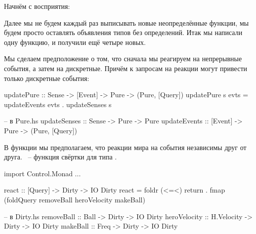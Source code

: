 Начнём с восприятия:


Далее мы не будем каждый раз выписывать новые неопределённые
функции, мы будем просто оставлять объявления типов без определений.
Итак мы написали одну функцию, и получили ещё четыре новых.

Мы сделаем предположение о том, что сначала мы реагируем
на непрерывные события, а затем на дискретные. Причём к 
запросам на реакции могут привести только дискретные события:

\begin{code}
updatePure :: Sense -> [Event] -> Pure -> (Pure, [Query])
updatePure s evts = updateEvents evts . updateSenses s 

-- в Pure.hs
updateSenses :: Sense -> Pure -> Pure
updateEvents :: [Event] -> Pure -> (Pure, [Query])
\end{code}

В функции  мы предполагаем, что реакции
мира на события независимы друг от друга. 
~-- функция свёртки для типа .

\begin{code}
import Control.Monad
...

react :: [Query] -> Dirty -> IO Dirty
react = foldr (<=<) return   
    . fmap (foldQuery removeBall heroVelocity makeBall)

-- в Dirty.hs
removeBall      :: Ball         -> Dirty -> IO Dirty
heroVelocity    :: H.Velocity   -> Dirty -> IO Dirty
makeBall        :: Freq         -> Dirty -> IO Dirty
\end{code}

